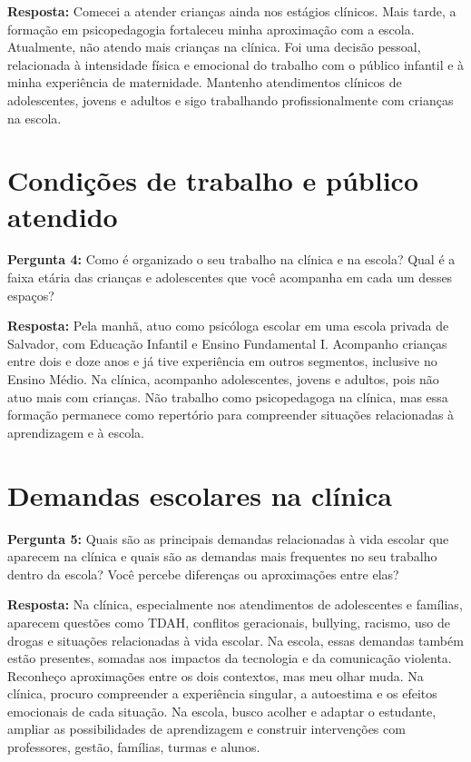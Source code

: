 \documentclass[12pt,a4paper,oneside]{abntex2}
\begin{document}
\noindent\textbf{Resposta:} Comecei a atender crianças ainda nos estágios clínicos. Mais tarde, a formação em psicopedagogia fortaleceu minha aproximação com a escola. Atualmente, não atendo mais crianças na clínica. Foi uma decisão pessoal, relacionada à intensidade física e emocional do trabalho com o público infantil e à minha experiência de maternidade. Mantenho atendimentos clínicos de adolescentes, jovens e adultos e sigo trabalhando profissionalmente com crianças na escola.

\section{Condições de trabalho e público atendido}

\noindent\textbf{Pergunta 4:} Como é organizado o seu trabalho na clínica e na escola? Qual é a faixa etária das crianças e adolescentes que você acompanha em cada um desses espaços?

\noindent\textbf{Resposta:} Pela manhã, atuo como psicóloga escolar em uma escola privada de Salvador, com Educação Infantil e Ensino Fundamental I. Acompanho crianças entre dois e doze anos e já tive experiência em outros segmentos, inclusive no Ensino Médio. Na clínica, acompanho adolescentes, jovens e adultos, pois não atuo mais com crianças. Não trabalho como psicopedagoga na clínica, mas essa formação permanece como repertório para compreender situações relacionadas à aprendizagem e à escola.

\section{Demandas escolares na clínica}

\noindent\textbf{Pergunta 5:} Quais são as principais demandas relacionadas à vida escolar que aparecem na clínica e quais são as demandas mais frequentes no seu trabalho dentro da escola? Você percebe diferenças ou aproximações entre elas?

\noindent\textbf{Resposta:} Na clínica, especialmente nos atendimentos de adolescentes e famílias, aparecem questões como TDAH, conflitos geracionais, bullying, racismo, uso de drogas e situações relacionadas à vida escolar. Na escola, essas demandas também estão presentes, somadas aos impactos da tecnologia e da comunicação violenta. Reconheço aproximações entre os dois contextos, mas meu olhar muda. Na clínica, procuro compreender a experiência singular, a autoestima e os efeitos emocionais de cada situação. Na escola, busco acolher e adaptar o estudante, ampliar as possibilidades de aprendizagem e construir intervenções com professores, gestão, famílias, turmas e alunos.
\end{document}
